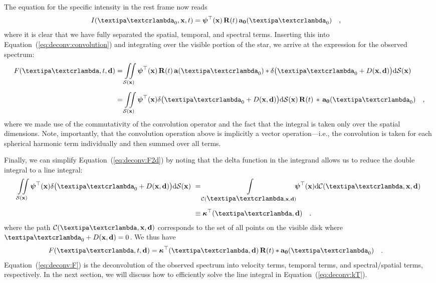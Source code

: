 \documentclass[modern]{aastex631}
\begin{document}
The equation for the specific intensity in the rest frame now reads
%
\begin{align}
    \label{eq:deconv:Ivecfull}
    I(\lnlam_0, \x, t) & =
    \ylmbasis(\x)
    \,
    \R(t)
    \,
    \azero(\lnlam_0)
    \quad ,
\end{align}
%
where it is clear that we have fully separated the spatial, temporal, and spectral terms. 
Inserting this into Equation~(\ref{eq:deconv:convolution})
and integrating over the visible portion of the star, we arrive at the expression for the observed spectrum:
%
%
\begin{align}
    \label{eq:deconv:F2d}
    F(\lnlam, t, \Dargs) & =
    \iint\limits_{\Surf(\x)}
    \ylmbasis(\x)
    \,
    \R(t)
    \,
    \alm(\lnlam_0)
    * \delta\big(\lnlam_0 + \D(\x, \Dargs)\big)
    \mathrm{d}\Surf(\x)
    \nonumber                \\[0.5em]
                         & =
    \iint\limits_{\Surf(\x)}
    \ylmbasis(\x)
    \delta\big(\lnlam_0 + \D(\x, \Dargs)\big)
    \mathrm{d}\Surf(\x)
    \,
    \R(t)
    \,
    *
    \,
    \azero(\lnlam_0)
    \quad ,
\end{align}
%
%
where we made use of the commutativity of the convolution operator and the fact that the integral is taken only over the spatial dimensions.
Note, importantly, that the convolution operation above is implicitly a vector operation---i.e., the convolution is taken for each spherical harmonic term individually and then summed over all terms.

Finally, we can simplify Equation~(\ref{eq:deconv:F2d}) by noting that the delta function in the integrand allows us to reduce the double integral to a line integral:
%
\begin{align}
    \label{eq:deconv:kT}
    \iint\limits_{\Surf(\x)}
    \ylmbasis(\x)
    \delta\big(\lnlam_0 + \D(\x, \Dargs)\big)
    \mathrm{d}\Surf(\x)
    \, \,
     & =
    \int\limits_{\Curve(\lnlam, \x, \Dargs)}
    \hspace*{-0.6em}\ylmbasis(\x)
    \mathrm{d}\Curve(\lnlam, \x, \Dargs)
    \nonumber                     \\[0.5em]
     & \equiv \kT(\lnlam, \Dargs)
    \quad.
\end{align}
%
where the path $\Curve(\lnlam, \x, \Dargs)$ corresponds to the set of all points on the visible disk where $\lnlam_0 + \D(\x, \Dargs) = 0$.
%
We thus have
%
\begin{align}
    \label{eq:deconv:F}
    F(\lnlam, t, \Dargs)
     & =
    \kT(\lnlam, \Dargs) \, \R(t)
    *
    \azero(\lnlam_0)
    \quad.
\end{align}
%
Equation~(\ref{eq:deconv:F}) is the deconvolution of the observed spectrum into velocity terms, temporal terms, and spectral/spatial terms, respectively. 
In the next section, we will discuss how to efficiently solve the line integral in Equation~(\ref{eq:deconv:kT}).
\end{document}

